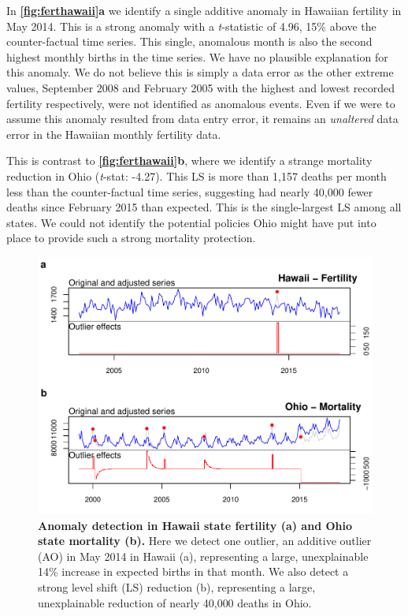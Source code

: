\documentclass[12pt]{article}
\begin{document}
In \textbf{\autoref{fig:ferthawaii}a} we identify a single additive
anomaly in Hawaiian fertility in May 2014. This is a strong anomaly with
a \emph{t}-statistic of 4.96, 15\% above the counter-factual time
series. This single, anomalous month is also the second highest monthly
births in the time series. We have no plausible explanation for this
anomaly. We do not believe this is simply a data error as the other
extreme values, September 2008 and February 2005 with the highest and
lowest recorded fertility respectively, were not identified as anomalous
events. Even if we were to assume this anomaly resulted from data entry
error, it remains an \emph{unaltered} data error in the Hawaiian monthly
fertility data.

This is contrast to \textbf{\autoref{fig:ferthawaii}b}, where we
identify a strange mortality reduction in Ohio (\emph{t}-stat: -4.27).
This LS is more than 1,157 deaths per month less than the
counter-factual time series, suggesting had nearly 40,000 fewer deaths
since February 2015 than expected. This is the single-largest LS among
all states. We could not identify the potential policies Ohio might have
put into place to provide such a strong mortality protection.

\begin{figure}
\centering
\includegraphics{MainDocument_files/figure-latex/TrueAnomalies-1.pdf}
\caption{\textbf{Anomaly detection in Hawaii state fertility (a) and Ohio state mortality (b).}
Here we detect one outlier, an additive outlier (AO) in May 2014 in
Hawaii (a), representing a large, unexplainable 14\% increase in
expected births in that month. We also detect a strong level shift (LS)
reduction (b), representing a large, unexplainable reduction of nearly
40,000 deaths in Ohio. \label{fig:ferthawaii}}
\end{figure}
\end{document}
